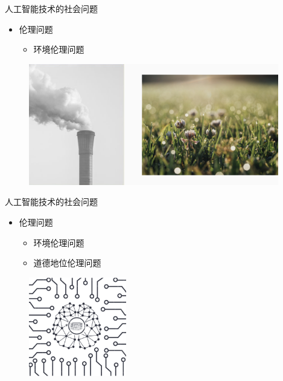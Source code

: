 \documentclass{beamer}
\begin{document}
\begin{frame}{人工智能技术的社会问题}
  \begin{itemize}
    \item 伦理问题 
      \begin{itemize}
       \item  环境伦理问题 
      \end{itemize}
  \end{itemize}

  \begin{figure}[H]
   \centering
   \includegraphics[width=4.3in]{zsjPic4.jpg}
   \end{figure}
  \end{frame}

\begin{frame}{人工智能技术的社会问题}
  \begin{itemize}
    \item 伦理问题 
      \begin{itemize}
       \item  环境伦理问题 
       \item  道德地位伦理问题  
      \end{itemize}
  \end{itemize}

  \begin{figure}[H]
   \centering
   \includegraphics[height=1.7in]{zsjPic5.jpg}
   \end{figure}

\end{frame} 
\end{document}
